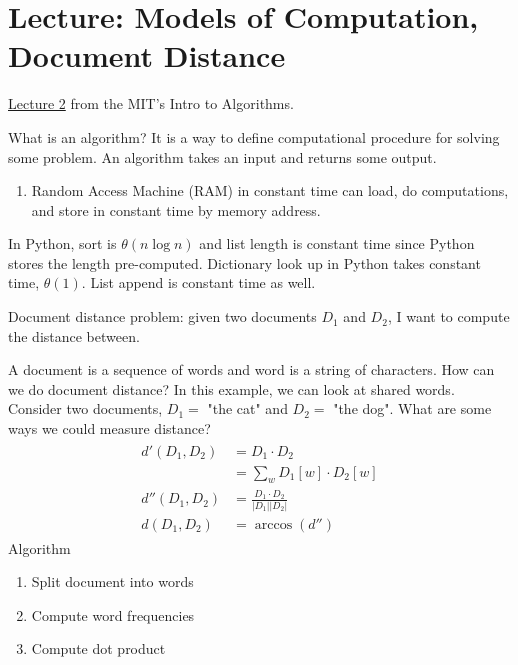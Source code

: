 \chapter{Lecture: Models of Computation, Document Distance}
\href{https://ocw.mit.edu/courses/electrical-engineering-and-computer-science/6-006-introduction-to-algorithms-fall-2011/lecture-videos/lecture-2-models-of-computation-document-distance/}{Lecture 2} from the MIT's 
Intro to Algorithms.

What is an algorithm? It is a way to define computational procedure for solving some problem. An
algorithm takes an input and returns some output. 
\begin{enumerate}
	\item Random Access Machine (RAM) in constant time can load, do computations, and store
	in constant time by memory address.
\end{enumerate}
In Python, sort is \(\theta(n\log n)\) and list length is constant time since Python stores the length 
pre-computed. Dictionary look up in Python takes constant time, \(\theta(1)\). List append is constant 
time as well.
\begin{definition}
	Document distance problem: given two documents \(D_1\) and \(D_2\), I want to compute the 
	distance between.
\end{definition}
\noindent
A document is a sequence of words and word is a string of characters. How can we do document 
distance? In this example, we can look at shared words. Consider two documents, \(D_1 =\) "the cat" 
and \(D_2 =\) "the dog". What are some ways we could measure distance?
\begin{align*}
	\begin{aligned}
		d'(D_1, D_2) & = D_1\cdot D_2\\
		 & = \sum_wD_1[w]\cdot D_2[w]\\
		 d''(D_1, D_2) & = \frac{D_1\cdot D_2}{\lvert D_1\rvert\lvert D_2\rvert}\\
		 d(D_1, D_2) & = \arccos(d'') 
	\end{aligned}
\end{align*}
Algorithm
\begin{enumerate}
	\item Split document into words
	\item Compute word frequencies
	\item Compute dot product
\end{enumerate}